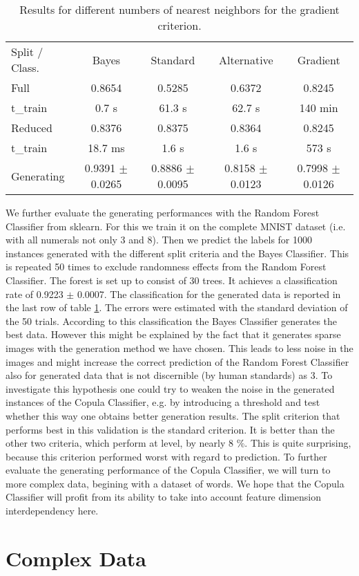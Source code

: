 \documentclass{article}
\begin{document}
\begin{table}[h]
	\centering
	\begin{tabular}{l c c c c}
		Split / Class.&	Bayes 	& Standard	& Alternative 	& Gradient	\\
		Full		&	0.8654	&	0.5285	&	0.6372		& 0.8245	\\
	 	t\_train	&   0.7 s	&	61.3 s	&	62.7 s		& 140 min	\\
		Reduced 	& 	0.8376	&	0.8375	&	0.8364		& 0.8245	\\
		t\_train	&   18.7 ms	&	1.6 s	&   1.6 s		& 573 s		\\
   		Generating	& 	0.9391 $\pm$ 0.0265	&	0.8886 $\pm$ 0.0095		& 0.8158 $\pm$ 0.0123 & 0.7998 $\pm$ 0.0126 \\
	\end{tabular}
	\caption{Results for different numbers of nearest neighbors for the gradient criterion.}
	\label{tab5}
\end{table}

We further evaluate the generating performances with the Random Forest Classifier from sklearn.
For this we train it on the complete MNIST dataset (i.e. with all numerals not only 3 and 8).
Then we predict the labels for 1000 instances generated with the different split criteria and 
the Bayes Classifier. This is repeated 50 times to exclude randomness effects from the Random Forest Classifier.
The forest is set up to consist of 30 trees.
It achieves a classification rate of 0.9223 $\pm$ 0.0007.
The classification for the generated data is reported in the last row of table \ref{tab5}. 
The errors were estimated with the standard deviation of the 50 trials.
\newline
According to this classification the Bayes Classifier generates the best data. However this might
be explained by the fact that it generates sparse images with the generation method we have chosen.
This leads to less noise in the images and might increase the correct prediction of the Random Forest Classifier 
also for generated data that is not discernible (by human standards) as 3.
To investigate this hypothesis one could try to weaken the noise in the generated instances of the Copula Classifier,
e.g. by introducing a threshold and test whether this way one obtains better generation results.
\newline
The split criterion that performs best in this validation is the standard criterion.
It is better than the other two criteria, which perform at level, by nearly 8 \%.
This is quite surprising, because this criterion performed worst with regard to prediction.
\newline
To further evaluate the generating performance of the Copula Classifier, we will turn to more complex data,
begining with a dataset of words. We hope that the Copula Classifier will profit from its ability to take into 
account feature dimension interdependency here.

\section{Complex Data}
\end{document}
